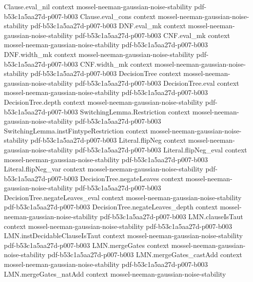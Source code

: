 \begin{theorem}
\proofstep
  {Clause.eval_nil}
  {context}
  {mossel-neeman-gaussian-noise-stability}
  {pdf-b53c1a5aa27d-p007-b003}
\proofstep
  {Clause.eval_cons}
  {context}
  {mossel-neeman-gaussian-noise-stability}
  {pdf-b53c1a5aa27d-p007-b003}
\proofstep
  {DNF.eval_mk}
  {context}
  {mossel-neeman-gaussian-noise-stability}
  {pdf-b53c1a5aa27d-p007-b003}
\proofstep
  {CNF.eval_mk}
  {context}
  {mossel-neeman-gaussian-noise-stability}
  {pdf-b53c1a5aa27d-p007-b003}
\proofstep
  {DNF.width_mk}
  {context}
  {mossel-neeman-gaussian-noise-stability}
  {pdf-b53c1a5aa27d-p007-b003}
\proofstep
  {CNF.width_mk}
  {context}
  {mossel-neeman-gaussian-noise-stability}
  {pdf-b53c1a5aa27d-p007-b003}
\proofstep
  {DecisionTree}
  {context}
  {mossel-neeman-gaussian-noise-stability}
  {pdf-b53c1a5aa27d-p007-b003}
\proofstep
  {DecisionTree.eval}
  {context}
  {mossel-neeman-gaussian-noise-stability}
  {pdf-b53c1a5aa27d-p007-b003}
\proofstep
  {DecisionTree.depth}
  {context}
  {mossel-neeman-gaussian-noise-stability}
  {pdf-b53c1a5aa27d-p007-b003}
\proofstep
  {SwitchingLemma.Restriction}
  {context}
  {mossel-neeman-gaussian-noise-stability}
  {pdf-b53c1a5aa27d-p007-b003}
\proofstep
  {SwitchingLemma.instFintypeRestriction}
  {context}
  {mossel-neeman-gaussian-noise-stability}
  {pdf-b53c1a5aa27d-p007-b003}
\proofstep
  {Literal.flipNeg}
  {context}
  {mossel-neeman-gaussian-noise-stability}
  {pdf-b53c1a5aa27d-p007-b003}
\proofstep
  {Literal.flipNeg_eval}
  {context}
  {mossel-neeman-gaussian-noise-stability}
  {pdf-b53c1a5aa27d-p007-b003}
\proofstep
  {Literal.flipNeg_var}
  {context}
  {mossel-neeman-gaussian-noise-stability}
  {pdf-b53c1a5aa27d-p007-b003}
\proofstep
  {DecisionTree.negateLeaves}
  {context}
  {mossel-neeman-gaussian-noise-stability}
  {pdf-b53c1a5aa27d-p007-b003}
\proofstep
  {DecisionTree.negateLeaves_eval}
  {context}
  {mossel-neeman-gaussian-noise-stability}
  {pdf-b53c1a5aa27d-p007-b003}
\proofstep
  {DecisionTree.negateLeaves_depth}
  {context}
  {mossel-neeman-gaussian-noise-stability}
  {pdf-b53c1a5aa27d-p007-b003}
\proofstep
  {LMN.clauseIsTaut}
  {context}
  {mossel-neeman-gaussian-noise-stability}
  {pdf-b53c1a5aa27d-p007-b003}
\proofstep
  {LMN.instDecidableClauseIsTaut}
  {context}
  {mossel-neeman-gaussian-noise-stability}
  {pdf-b53c1a5aa27d-p007-b003}
\proofstep
  {LMN.mergeGates}
  {context}
  {mossel-neeman-gaussian-noise-stability}
  {pdf-b53c1a5aa27d-p007-b003}
\proofstep
  {LMN.mergeGates_castAdd}
  {context}
  {mossel-neeman-gaussian-noise-stability}
  {pdf-b53c1a5aa27d-p007-b003}
\proofstep
  {LMN.mergeGates_natAdd}
  {context}
  {mossel-neeman-gaussian-noise-stability}

\end{theorem}
